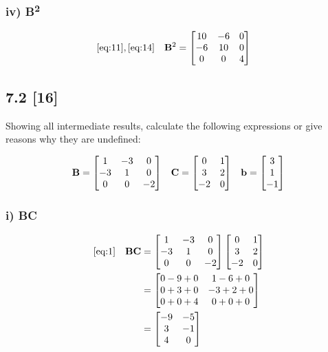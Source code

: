 \documentclass{article}
\begin{document}
\subsubsection*{iv) \textbf{B}\textsuperscript{2}}

\begin{align}
    \label{eq:15}
    \eqref{eq:11}, \eqref{eq:14} &&
    \textbf{B}\textsuperscript{2} &= \begin{bmatrix}
    10 & -6 & 0\\
    -6 & 10 & 0\\
    0 & 0 & 4
    \end{bmatrix}
\end{align}

\subsection*{7.2 [16]}
\setcounter{equation}{0}

Showing all intermediate results, calculate the following expressions or give reasons why they are undefined:

\def \Cmatrix {
\begin{bmatrix}
0 & 1\\
3 & 2\\
-2 & 0
\end{bmatrix}
}
\def \bbmatrix {
\begin{bmatrix}
3\\
1\\
-1
\end{bmatrix}
}

\begin{align}
    \label{eq:1}
    \textbf{B} = \Bmatrix && \textbf{C} = \Cmatrix && \textbf{b} = \bbmatrix
\end{align}

\subsubsection*{i) \textbf{BC}}

\begin{align}
    \label{eq:2}
    \eqref{eq:1} &&
    \textbf{BC} &= \Bmatrix \Cmatrix
    \\
    \label{eq:3}
    && &= \begin{bmatrix}
    0-9+0 & 1-6+0\\
    0+3+0 & -3+2+0\\
    0+0+4 & 0+0+0
    \end{bmatrix}
    \\
    \label{eq:4}
    && &= \begin{bmatrix}
    -9 & -5\\
    3 & -1\\
    4 & 0
    \end{bmatrix}
\end{align}
\end{document}

